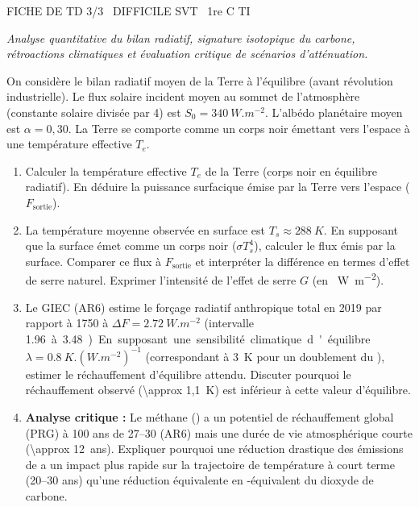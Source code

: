 \documentclass[11pt]{article}
\begin{document}
\begin{tcolorbox}[enhanced,colback=popink,colframe=popink,arc=10pt,boxrule=0pt,left=12pt,right=12pt,top=9pt,bottom=9pt]
{\color{white}\popxbold\small FICHE DE TD 3/3 \textbullet\ DIFFICILE \hfill SVT \textbullet\ 1re C TI\par}
\end{tcolorbox}
\vspace{4pt}
\emph{Analyse quantitative du bilan radiatif, signature isotopique du carbone, rétroactions climatiques et évaluation critique de scénarios d'atténuation.}

\begin{exercice}
On considère le bilan radiatif moyen de la Terre à l'équilibre (avant révolution industrielle). Le flux solaire incident moyen au sommet de l'atmosphère (constante solaire divisée par 4) est $S_0 = \SI{340}{W.m^{-2}}$. L'albédo planétaire moyen est $\alpha = 0,30$. La Terre se comporte comme un corps noir émettant vers l'espace à une température effective $T_e$.

\begin{enumerate}
    \item Calculer la température effective $T_e$ de la Terre (corps noir en équilibre radiatif). En déduire la puissance surfacique émise par la Terre vers l'espace ($F_{\text{sortie}}$).
    \item La température moyenne observée en surface est $T_s \approx \SI{288}{K}$. En supposant que la surface émet comme un corps noir ($\sigma T_s^4$), calculer le flux émis par la surface. Comparer ce flux à $F_{\text{sortie}}$ et interpréter la différence en termes d'effet de serre naturel. Exprimer l'intensité de l'effet de serre $G$ (en \SI{}{W.m^{-2}}).
    \item Le GIEC (AR6) estime le forçage radiatif anthropique total en 2019 par rapport à 1750 à $\Delta F = \SI{+2,72}{W.m^{-2}}$ (intervalle \SI{1,96} à \SI{3,48}). En supposant une sensibilité climatique d'équilibre $\lambda = \SI{0,8}{K.(W.m^{-2})^{-1}}$ (correspondant à \SI{3}{K} pour un doublement du ), estimer le réchauffement d'équilibre attendu. Discuter pourquoi le réchauffement observé (\SI{\approx 1,1}{K}) est inférieur à cette valeur d'équilibre.
    \item \textbf{Analyse critique :} Le méthane () a un potentiel de réchauffement global (PRG) à 100 ans de 27--30 (AR6) mais une durée de vie atmosphérique courte (\SI{\approx 12}{ans}). Expliquer pourquoi une réduction drastique des émissions de  a un impact plus rapide sur la trajectoire de température à court terme (20--30 ans) qu'une réduction équivalente en -équivalent du dioxyde de carbone.
\end{enumerate}
\end{exercice}
\end{document}
